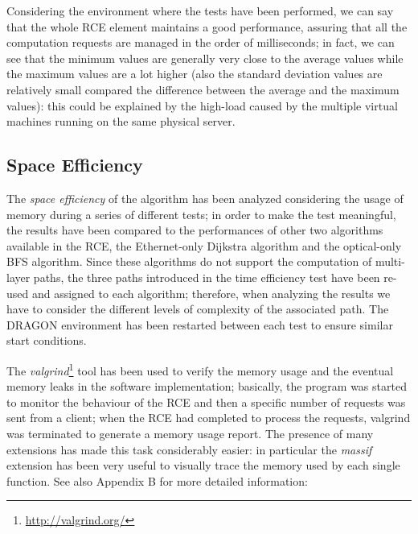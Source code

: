 \documentclass[10pt,a4paper]{report}
\begin{document}
Considering the environment where the tests have been performed, we
can say that the whole RCE element maintains a good performance,
assuring that all the computation requests are managed in the order of
milliseconds; in fact, we can see that the minimum values are
generally very close to the average values while the maximum values
are a lot higher (also the standard deviation values are relatively
small compared the difference between the average and the maximum
values): this could be explained by the high-load caused by the
multiple virtual machines running on the same physical server.

\subsection{Space Efficiency}

The \textit{space efficiency} of the algorithm has been analyzed
considering the usage of memory during a series of different tests; in
order to make the test meaningful, the results have been compared to
the performances of other two algorithms available in the RCE, the
Ethernet-only Dijkstra algorithm and the optical-only BFS
algorithm. Since these algorithms do not support the computation of
multi-layer paths, the three paths introduced in the time efficiency
test have been re-used and assigned to each algorithm; therefore, when
analyzing the results we have to consider the different levels of
complexity of the associated path. The DRAGON environment has been
restarted between each test to ensure similar start conditions.

The \textit{valgrind}\footnote{\url{http://valgrind.org/}} tool has
been used to verify the memory usage and the eventual memory leaks in
the software implementation; basically, the program was started to
monitor the behaviour of the RCE and then a specific number of
requests was sent from a client; when the RCE had completed to process
the requests, valgrind was terminated to generate a memory usage
report. The presence of many extensions has made this task
considerably easier: in particular the \textit{massif} extension has
been very useful to visually trace the memory used by each single
function. See also Appendix B for more detailed information:
\end{document}
